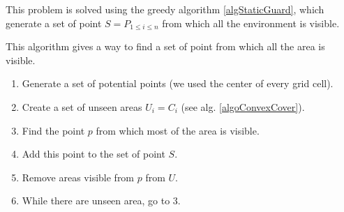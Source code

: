 This problem is solved using the greedy algorithm \ref{algStaticGuard}, which generate a set of point $ S = P_{1\leq i \leq n}$ from which all the environment is visible.

\begin{algorithm}
This algorithm gives a way to find a set of point from which all the area is visible.
\begin{enumerate}
	\item Generate a set of potential points (we used the center of every grid cell).
	\item Create a set of unseen areas $U_i = C_i$ (see alg. \ref{algoConvexCover}).
	\item Find the point $p$ from which most of the area is visible.
	\item Add this point to the set of point $S$.
	\item Remove areas visible from $p$ from $U$.
	\item While there are unseen area, go to 3.
\end{enumerate}
\label{algStaticGuard}
\end{algorithm}